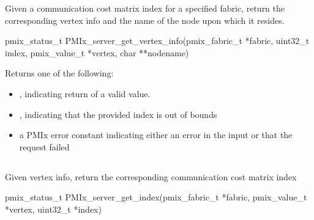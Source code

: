 \summary

Given a communication cost matrix index for a specified fabric, return the corresponding vertex info and the name of the node upon which it resides.

\format

\cspecificstart
\begin{codepar}
pmix_status_t
PMIx_server_get_vertex_info(pmix_fabric_t *fabric,
                            uint32_t index, pmix_value_t *vertex,
                            char **nodename)
\end{codepar}
\cspecificend

\begin{arglist}
\end{arglist}

Returns one of the following:

\begin{itemize}
    \item {}, indicating return of a valid value.
    \item {}, indicating that the provided index is out of bounds
    \item a \ac{PMIx} error constant indicating either an error in the input or that the request failed
\end{itemize}

\descr


\subsection{}

\summary

Given vertex info, return the corresponding communication cost matrix index

\format

\cspecificstart
\begin{codepar}
pmix_status_t
PMIx_server_get_index(pmix_fabric_t *fabric,
                      pmix_value_t *vertex,
                      uint32_t *index)
\end{codepar}
\cspecificend

